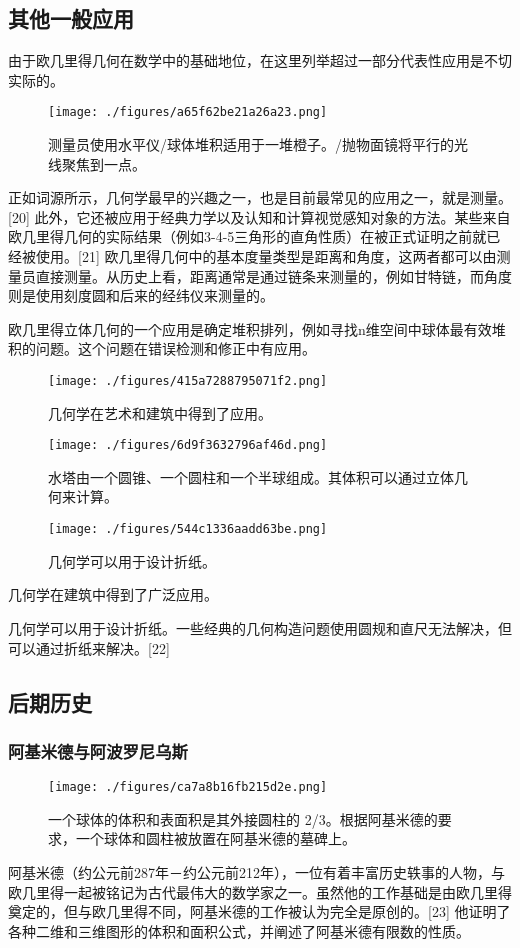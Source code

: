 \subsection{其他一般应用}  
由于欧几里得几何在数学中的基础地位，在这里列举超过一部分代表性应用是不切实际的。
\begin{figure}[ht]
\centering
\texttt{[image: ./figures/a65f62be21a26a23.png]}
\caption{测量员使用水平仪/球体堆积适用于一堆橙子。/抛物面镜将平行的光线聚焦到一点。} \label{fig_OJLJH_20}
\end{figure}
正如词源所示，几何学最早的兴趣之一，也是目前最常见的应用之一，就是测量。[20] 此外，它还被应用于经典力学以及认知和计算视觉感知对象的方法。某些来自欧几里得几何的实际结果（例如3-4-5三角形的直角性质）在被正式证明之前就已经被使用。[21] 欧几里得几何中的基本度量类型是距离和角度，这两者都可以由测量员直接测量。从历史上看，距离通常是通过链条来测量的，例如甘特链，而角度则是使用刻度圆和后来的经纬仪来测量的。

欧几里得立体几何的一个应用是确定堆积排列，例如寻找n维空间中球体最有效堆积的问题。这个问题在错误检测和修正中有应用。
\begin{figure}[ht]
\centering
\texttt{[image: ./figures/415a7288795071f2.png]}
\caption{几何学在艺术和建筑中得到了应用。} \label{fig_OJLJH_21}
\end{figure}
\begin{figure}[ht]
\centering
\texttt{[image: ./figures/6d9f3632796af46d.png]}
\caption{水塔由一个圆锥、一个圆柱和一个半球组成。其体积可以通过立体几何来计算。} \label{fig_OJLJH_22}
\end{figure}
\begin{figure}[ht]
\centering
\texttt{[image: ./figures/544c1336aadd63be.png]}
\caption{几何学可以用于设计折纸。} \label{fig_OJLJH_23}
\end{figure}
几何学在建筑中得到了广泛应用。

几何学可以用于设计折纸。一些经典的几何构造问题使用圆规和直尺无法解决，但可以通过折纸来解决。[22]
\subsection{后期历史}  
\subsubsection{阿基米德与阿波罗尼乌斯}
\begin{figure}[ht]
\centering
\texttt{[image: ./figures/ca7a8b16fb215d2e.png]}
\caption{一个球体的体积和表面积是其外接圆柱的 2/3。根据阿基米德的要求，一个球体和圆柱被放置在阿基米德的墓碑上。} \label{fig_OJLJH_24}
\end{figure}
阿基米德（约公元前287年－约公元前212年），一位有着丰富历史轶事的人物，与欧几里得一起被铭记为古代最伟大的数学家之一。虽然他的工作基础是由欧几里得奠定的，但与欧几里得不同，阿基米德的工作被认为完全是原创的。[23] 他证明了各种二维和三维图形的体积和面积公式，并阐述了阿基米德有限数的性质。

